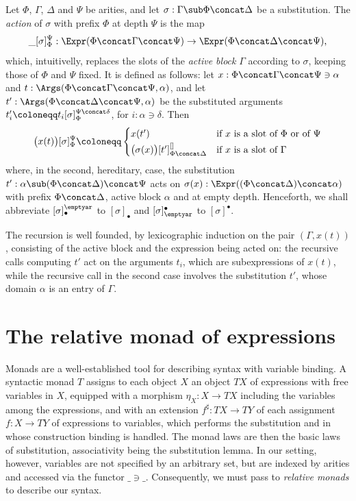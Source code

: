 \begin{definition}\label{def:action}
    Let $\Phi$, $\Gamma$, $\Delta$ and $\Psi$ be arities, and let $\sigma : \Gamma \sub \Phi \concat \Delta$ be a substitution. The \emph{action} of $\sigma$ with prefix $\Phi$ at depth $\Psi$ is the map
    \[
    \_[\sigma]_\Phi^\Psi : \Expr(\Phi \concat \Gamma \concat \Psi) \to \Expr(\Phi \concat \Delta \concat \Psi),
    \]
    which, intuitivelly, replaces the slots of the \emph{active block} $\Gamma$ according to $\sigma$, keeping those of $\Phi$ and $\Psi$ fixed. It is defined as follows: let $x : \Phi \concat \Gamma \concat \Psi \ni \alpha$ and $t : \Args(\Phi \concat \Gamma \concat \Psi, \alpha)$, and let $t' : \Args(\Phi \concat \Delta \concat \Psi, \alpha)$ be the substituted arguments $t'_i \coloneqq t_i[\sigma]_\Phi^{\Psi \concat \delta}$, for $i : \alpha \ni \delta$. Then
    \[
    \big(x(t)\big)[\sigma]_\Phi^\Psi \coloneqq
    \begin{cases}
        x(t') & \text{if $x$ is a slot of $\Phi$ or of $\Psi$}\\[2pt]
        \big(\sigma(x)\big)[t']_{\Phi\concat\Delta}^{[]} & \text{if $x$ is a slot of $\Gamma$}
    \end{cases}
    \]
    where, in the second, hereditary, case, the substitution $t' : \alpha \sub (\Phi \concat \Delta) \concat \Psi$ acts on $\sigma(x) : \Expr((\Phi \concat \Delta) \concat \alpha)$ with prefix $\Phi \concat \Delta$, active block $\alpha$ and at empty depth. Henceforth, we shall abbreviate $[\sigma]_\bullet^{\emptyar}$ to $[\sigma]_\bullet$ and $[\sigma]^\bullet_{\emptyar}$ to $[\sigma]^\bullet$.

    The recursion is well founded, by lexicographic induction on the pair $(\Gamma, x(t))$, consisting of the active block and the expression being acted on: the recursive calls computing $t'$ act on the arguments $t_i$, which are subexpressions of $x(t)$, while the recursive call in the second case involves the substitution $t'$, whose domain $\alpha$ is an entry of $\Gamma$.
\end{definition}

\section{The relative monad of expressions}

Monads are a well-established tool for describing syntax with variable binding. A syntactic monad $T$ assigns to each object $X$ an object $TX$ of expressions with free variables in $X$, equipped with a morphism $\eta_X : X \to TX$ including the variables among the expressions, and with an extension $f^\sharp : TX \to TY$ of each assignment $f : X \to TY$ of expressions to variables, which performs the substitution and in whose construction binding is handled. The monad laws are then the basic laws of substitution, associativity being the substitution lemma. In our setting, however, variables are not specified by an arbitrary set, but are indexed by arities and accessed via the functor $\_\ni\_$. Consequently, we must pass to \emph{relative monads} \cite{AltenkirchChapmanUustalu2015} to describe our syntax.

